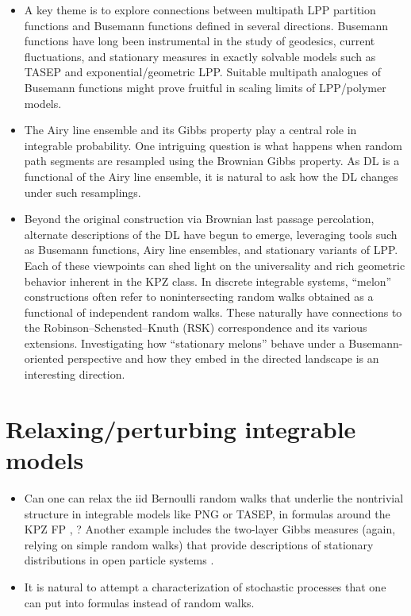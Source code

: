\documentclass{article}
\theoremstyle{definition}
\begin{document}
\begin{itemize}
    \item
    A key theme is to explore connections between multipath LPP
		partition functions
		and Busemann functions defined in several directions.
		Busemann functions have long been instrumental in the study of geodesics, current fluctuations, and stationary measures in exactly solvable models such as TASEP and exponential/geometric LPP.
		Suitable multipath analogues of Busemann functions might prove fruitful in scaling limits of
		LPP/polymer models.

    \item
			The Airy line ensemble and its Gibbs property \cite{corwin2014brownian} play a central role in integrable probability.
			One intriguing question is what happens when random path
			segments are resampled using the Brownian Gibbs property.
			As DL is a functional of the Airy line ensemble, it is
			natural to ask how the DL changes under such resamplings.

    \item
    Beyond the original construction via Brownian last passage percolation, alternate descriptions of the DL have begun to emerge, leveraging tools such as Busemann functions, Airy line ensembles, and stationary variants of LPP.
		Each of these viewpoints can shed light on the universality and rich geometric behavior inherent in the KPZ class.
    In discrete integrable systems, ``melon'' constructions often refer to nonintersecting
		random walks obtained as a functional of independent random walks.
		These naturally have connections to the Robinson–Schensted–Knuth (RSK) correspondence and its various extensions.
		Investigating how ``stationary melons'' behave under a
		Busemann-oriented perspective and how they embed in the
		directed landscape is an interesting direction.
\end{itemize}


\section{Relaxing/perturbing integrable models}
\begin{itemize}
	\item
    Can one can relax the iid Bernoulli random walks that underlie
		the nontrivial structure in integrable models like PNG or TASEP,
		in formulas around the KPZ FP \cite{matetski2017kpz}, \cite{matetski2022polynuclear}?
		Another example includes the
		two-layer Gibbs measures (again, relying on simple random walks) that provide
		descriptions of stationary distributions in open particle systems
		\cite{BarraquandCorwinYang2023}.

    \item
    It is natural to attempt a characterization of
		stochastic processes that one can put into
		formulas instead of random walks.
\end{itemize}
\end{document}
